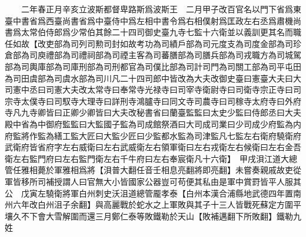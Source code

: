 　　二年春正月辛亥立波斯都督卑路斯爲波斯王　二月甲子改百官名以門下省爲東臺中書省爲西臺尚書省爲中臺侍中爲左相中書令爲右相僕射爲匡政左右丞爲肅機尚書爲太常伯侍郎爲少常伯其餘二十四司御史臺九寺七監十六衛並以義訓更其名而職任如故【改吏部為司列司勲司封如故考功為司績戶部為司元度支為司度金部為司珍倉部為司庾禮部為司禮祠部為司禋主客為司蕃膳部為司膳兵部為司戎職方為司城駕部為司輿庫部為司庫刑部為司刑都官為司僕比部為司計司門為司關工部為司平屯田為司田虞部為司虞水部為司川凡二十四司郎中皆改為大夫改御史臺曰憲臺大夫曰大司憲中丞曰司憲大夫改太常寺曰奉常寺光禄寺曰司宰寺衛尉寺曰司衛寺宗正寺曰司宗寺太僕寺曰司馭寺大理寺曰詳刑寺鴻臚寺曰同文寺司農寺曰司稼寺太府寺曰外府寺凡九寺卿皆曰正卿少卿皆曰大夫改秘書省曰蘭臺監監曰太史少監曰侍郎丞曰大夫殿中省為中御府監監曰大監國子監為司成館祭酒曰大司成司業曰少司成少府監為内府監將作監為繕工監大匠曰大監少匠曰少監都水監為司津監凡七監左右衛府驍衛府武衛府皆省府字左右威衛曰左右武威衛左右領軍衛曰左右戎衛左右候衛曰左右金吾衛左右監門府曰左右監門衛左右千牛府曰左右奉宸衛凡十六衛】　甲戌浿江道大總管任雅相薨於軍雅相爲將【浿普大翻任音壬相息亮翻將即亮翻】未嘗奏親戚故吏從軍皆移所司補授謂人曰官無大小皆國家公器豈可苟便其私由是軍中賞罸皆平人服其公　戊寅左驍衛將軍白州刺史沃沮道總管龎孝泰【白州本漢合浦縣地武德四年置南州六年改白州沮子余翻】與高麗戰於蛇水之上軍敗與其子十三人皆戰死蘇定方圍平壤久不下會大雪解圍而還三月鄭仁泰等敗鐵勒於天山【敗補邁翻下所敗翻】鐵勒九姓

